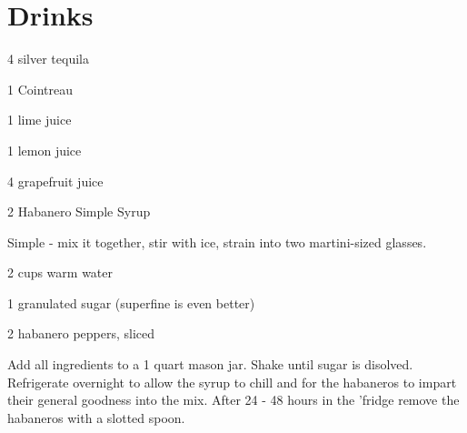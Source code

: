 \chapter{Drinks}


%
%
%
%
\newpage



\begin{IngredientsAndSteps}
    \ListIngredientsAndSteps
    {
        4 \Ounce silver tequila

        1 \Ounce Cointreau

        1 \Ounce lime juice

        1 \Ounce lemon juice

        4 \Ounce grapefruit juice

        2 \Ounce Habanero Simple Syrup
    }
    {
        Simple - mix it together, stir with ice, strain into two martini-sized glasses.
    }
\end{IngredientsAndSteps}

%
%
%
%
\newpage



\begin{IngredientsAndSteps}
    \ListIngredientsAndSteps
    {
        2 cups warm water

        1 granulated sugar (superfine is even better)

        2 habanero peppers, sliced
    }
    {
        Add all ingredients to a 1 quart mason jar. Shake until sugar is disolved. Refrigerate
        overnight to allow the syrup to chill and for the habaneros to impart their general
        goodness into the mix. After 24 - 48 hours in the 'fridge remove the habaneros with a
        slotted spoon.
    }
\end{IngredientsAndSteps}

